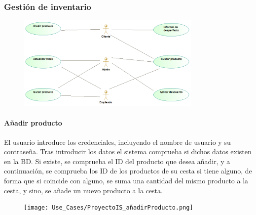 \subsubsection{Gestión de inventario}
\begin{figure}[H]
    \centering
    \includegraphics[width = 0.8\textwidth]{Use_Cases/gestion_de_inventario.png}
\end{figure}
\newpage
\paragraph{Añadir producto}
El usuario introduce los credenciales, incluyendo el nombre de usuario y su contraseña. Tras introducir los datos el sistema comprueba si dichos datos existen en la BD. Si existe, se comprueba el ID del producto que desea añadir, y a continuación, se comprueba los ID de los productos de su cesta si tiene alguno, de forma que si coincide con alguno, se suma una cantidad del mismo producto a la cesta, y sino, se añade un nuevo producto a la cesta.
\begin{figure}[H]
    \centering
    \texttt{[image: Use\_Cases/ProyectoIS\_añadirProducto.png]}
\end{figure}
\newpage
